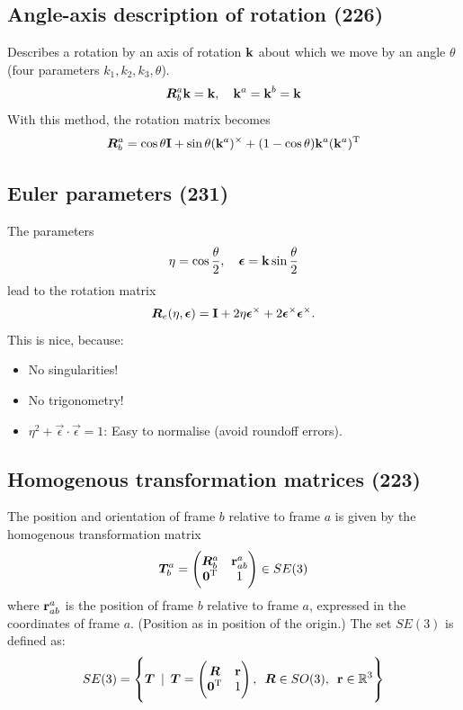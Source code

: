 \documentclass[a4paper, 12pt]{article}
\begin{document}
\subsection{Angle-axis description of rotation (226)}
Describes a rotation by an axis of rotation \( \mathbf{k} \) about which we move by an angle \( \theta \) (four parameters \( k_1, k_2, k_3, \theta \)).
\begin{equation}
	\bm{R}^a_b \mathbf{k} = \mathbf{k}, \quad \mathbf{k}^a = \mathbf{k}^b = \mathbf{k}
\end{equation}
With this method, the rotation matrix becomes
\begin{equation}
	\bm{R}^a_b = \cos \theta \mathbf{I}
	+ \sin \theta (\mathbf{k}^a)^\times
	+ (1-\cos \theta) \mathbf{k}^a(\mathbf{k}^a)^{\text{T}}
\end{equation}

\subsection{Euler parameters (231)}
The parameters
\begin{equation}
	\eta = \cos \frac{\theta}{2}, \quad
	\boldsymbol{\epsilon} = \mathbf{k} \sin \frac{\theta}{2}
\end{equation}
lead to the rotation matrix
\begin{equation}
	\bm{R}_e(\eta, \boldsymbol{\epsilon}) = \mathbf{I}
	+ 2 \eta \boldsymbol{\epsilon}^\times
	+ 2 \boldsymbol{\epsilon}^\times \boldsymbol{\epsilon}^\times
	.
\end{equation}
This is nice, because:
\begin{itemize}[nosep]
	\item No singularities!
	\item No trigonometry!
	\item \( \eta^2 + \vec{\epsilon} \cdot \vec{\epsilon} = 1 \): Easy to normalise (avoid roundoff errors).
\end{itemize}

\subsection{Homogenous transformation matrices (223)}
The position and orientation of frame \( b \) relative to frame \( a \) is given by the homogenous transformation matrix
\begin{equation}
	\bm{T}^a_b =
	\begin{pmatrix}
		\bm{R}^a_b  & \mathbf{r}^a_{ab} \\
		\mathbf{0}^{\text{T}} & 1
	\end{pmatrix}
	\in SE(3)
\end{equation}
where \( \mathbf{r}^a_{ab} \) is the position of frame \( b \) relative to frame \( a \), expressed in the coordinates of frame \( a \). (Position as in position of the origin.)
The set \(SE(3)\) is defined as:
\begin{equation}
	SE(3) = \left\lbrace \bm{T} \enspace |
	\enspace \bm{T} = \begin{pmatrix} \bm{R} & \mathbf{r} \\ \mathbf{0}^{\text{T}} & 1 \end{pmatrix},
	\enspace \bm{R} \in SO(3),
	\enspace \mathbf{r} \in \mathbb{R}^3
	\right\rbrace
\end{equation}
\end{document}
